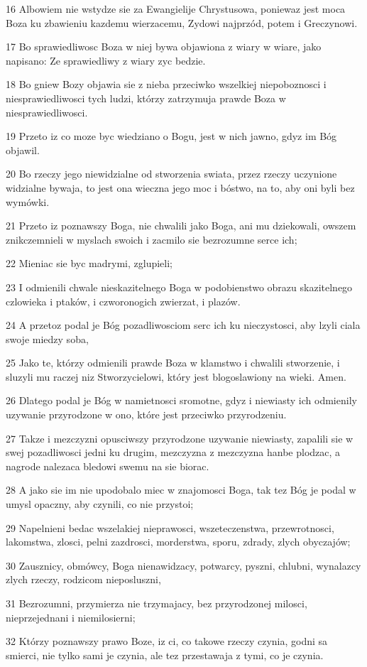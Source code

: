 \par 16 Albowiem nie wstydze sie za Ewangielije Chrystusowa, poniewaz jest moca Boza ku zbawieniu kazdemu wierzacemu, Zydowi najprzód, potem i Greczynowi.
\par 17 Bo sprawiedliwosc Boza w niej bywa objawiona z wiary w wiare, jako napisano: Ze sprawiedliwy z wiary zyc bedzie.
\par 18 Bo gniew Bozy objawia sie z nieba przeciwko wszelkiej niepoboznosci i niesprawiedliwosci tych ludzi, którzy zatrzymuja prawde Boza w niesprawiedliwosci.
\par 19 Przeto iz co moze byc wiedziano o Bogu, jest w nich jawno, gdyz im Bóg objawil.
\par 20 Bo rzeczy jego niewidzialne od stworzenia swiata, przez rzeczy uczynione widzialne bywaja, to jest ona wieczna jego moc i bóstwo, na to, aby oni byli bez wymówki.
\par 21 Przeto iz poznawszy Boga, nie chwalili jako Boga, ani mu dziekowali, owszem znikczemnieli w myslach swoich i zacmilo sie bezrozumne serce ich;
\par 22 Mieniac sie byc madrymi, zglupieli;
\par 23 I odmienili chwale nieskazitelnego Boga w podobienstwo obrazu skazitelnego czlowieka i ptaków, i czworonogich zwierzat, i plazów.
\par 24 A przetoz podal je Bóg pozadliwosciom serc ich ku nieczystosci, aby lzyli ciala swoje miedzy soba,
\par 25 Jako te, którzy odmienili prawde Boza w klamstwo i chwalili stworzenie, i sluzyli mu raczej niz Stworzycielowi, który jest blogoslawiony na wieki. Amen.
\par 26 Dlatego podal je Bóg w namietnosci sromotne, gdyz i niewiasty ich odmienily uzywanie przyrodzone w ono, które jest przeciwko przyrodzeniu.
\par 27 Takze i mezczyzni opusciwszy przyrodzone uzywanie niewiasty, zapalili sie w swej pozadliwosci jedni ku drugim, mezczyzna z mezczyzna hanbe plodzac, a nagrode nalezaca bledowi swemu na sie biorac.
\par 28 A jako sie im nie upodobalo miec w znajomosci Boga, tak tez Bóg je podal w umysl opaczny, aby czynili, co nie przystoi;
\par 29 Napelnieni bedac wszelakiej nieprawosci, wszeteczenstwa, przewrotnosci, lakomstwa, zlosci, pelni zazdrosci, morderstwa, sporu, zdrady, zlych obyczajów;
\par 30 Zausznicy, obmówcy, Boga nienawidzacy, potwarcy, pyszni, chlubni, wynalazcy zlych rzeczy, rodzicom nieposluszni,
\par 31 Bezrozumni, przymierza nie trzymajacy, bez przyrodzonej milosci, nieprzejednani i niemilosierni;
\par 32 Którzy poznawszy prawo Boze, iz ci, co takowe rzeczy czynia, godni sa smierci, nie tylko sami je czynia, ale tez przestawaja z tymi, co je czynia.

